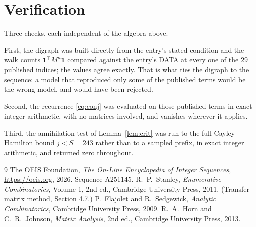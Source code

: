 \documentclass[11pt,a4paper]{article}
\theoremstyle{plain}
\theoremstyle{definition}
\begin{document}
\section{Verification}

Three checks, each independent of the algebra above.

First, the digraph was built directly from the entry's stated condition and the walk counts
$\mathbf{1}^{\!\top}M^{n}\mathbf{1}$ compared against the entry's DATA at every one of
the $29$ published indices; the values agree exactly. That is what ties the digraph to
the sequence: a model that reproduced only some of the published terms would be the wrong
model, and would have been rejected.

Second, the recurrence \eqref{eq:conj} was evaluated on those published terms in exact
integer arithmetic, with no matrices involved, and vanishes wherever it applies.

Third, the annihilation test of Lemma~\ref{lem:crit} was run to the full Cayley--Hamilton
bound $j<S=243$ rather than to a sampled prefix, in exact integer arithmetic, and returned
zero throughout.

\begin{thebibliography}{9}
 The OEIS Foundation, \emph{The On-Line Encyclopedia of Integer
Sequences}, \url{https://oeis.org}, 2026. Sequence A251145.
 R.~P.~Stanley, \emph{Enumerative Combinatorics}, Volume 1, 2nd ed.,
Cambridge University Press, 2011. (Transfer-matrix method, Section 4.7.)
 P.~Flajolet and R.~Sedgewick, \emph{Analytic Combinatorics}, Cambridge
University Press, 2009.
 R.~A.~Horn and C.~R.~Johnson, \emph{Matrix Analysis}, 2nd ed., Cambridge
University Press, 2013.
\end{thebibliography}
\end{document}
